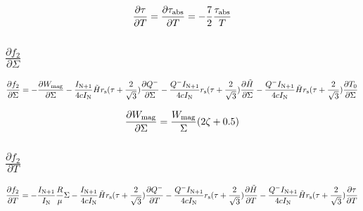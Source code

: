 \documentclass[11pt, oneside]{article}   	%
\begin{document}
\begin{equation}
	\frac{\partial\tau}{\partial T} = \frac{\partial\tau_{\rm abs}}{\partial T} = -\frac{7}{2}\frac{\tau_{\rm abs}}{T}
\end{equation}
	
\subsection*{$\frac{\partial f_2}{\partial\Sigma}$}
\begin{equation}
	\frac{\partial f_2}{\partial\Sigma} = -\frac{\partial W_{\rm mag}}{\partial \Sigma} - \frac{I_{\rm N+1}}{4cI_{\rm N}}\tilde Hr_{\rm s}(\tau+\frac{2}{\sqrt{3}})\frac{\partial Q^-}{\partial \Sigma} - \frac{Q^-I_{\rm N+1}}{4cI_{\rm N}}r_{\rm s}(\tau+\frac{2}{\sqrt{3}})\frac{\partial\tilde H}{\partial \Sigma} - \frac{Q^-I_{\rm N+1}}{4cI_{\rm N}}\tilde Hr_{\rm s}(\tau+\frac{2}{\sqrt{3}})\frac{\partial T_0}{\partial \Sigma}
\end{equation}

\begin{equation}
	\frac{\partial W_{\rm mag}}{\partial \Sigma} = \frac{W_{\rm mag}}{\Sigma}(2\zeta+0.5)
\end{equation}

\subsection*{$\frac{\partial f_2}{\partial T}$}
\begin{equation}
	\frac{\partial f_2}{\partial T} = -\frac{I_{\rm N+1}}{I_{\rm N}}\frac{R}{\mu}\Sigma - \frac{I_{\rm N+1}}{4cI_{\rm N}}\tilde Hr_{\rm s}(\tau+\frac{2}{\sqrt{3}})\frac{\partial Q^-}{\partial T}  -  \frac{Q^-I_{\rm N+1}}{4cI_{\rm N}}r_{\rm s}(\tau+\frac{2}{\sqrt{3}})\frac{\partial\tilde H}{\partial T}  -  \frac{Q^-I_{\rm N+1}}{4cI_{\rm N}}\tilde Hr_{\rm s}(\tau+\frac{2}{\sqrt{3}})\frac{\partial\tau}{\partial T} 
\end{equation} 
\end{document}
